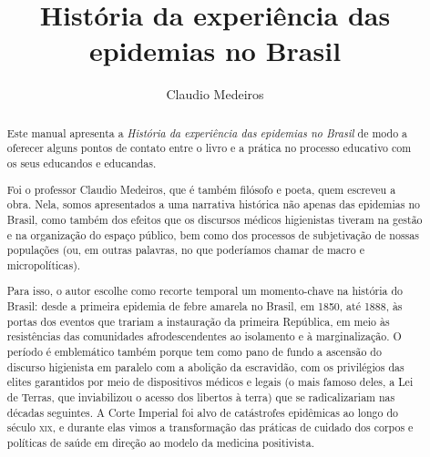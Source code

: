 \documentclass[12pt]{extarticle}
\begin{document}
\newcommand{\AutorLivro}{Claudio Medeiros}
\newcommand{\TituloLivro}{História da experiência das epidemias no Brasil}
\newcommand{\Tema}{Diálogos com a sociologia e com a antropologia}
\newcommand{\Genero}{Narrativa histórica}
\newcommand{\imagemCapa}{./images/PNLD0061-01.png}
\newcommand{\issnppub}{---}
\newcommand{\issnepub}{---}
\newcommand{\colaborador}{{Rafael Zacca Fernandes}}


\title{\TituloLivro}
\author{\AutorLivro}
\def\authornotes{\colaborador}

\date{}
\maketitle

\begin{abstract}

Este manual apresenta a \emph{História da experiência das epidemias no
Brasil} de modo a oferecer alguns pontos de contato entre o livro e a
prática no processo educativo com os seus educandos e educandas.

Foi o professor Claudio Medeiros, que é também filósofo e poeta, quem
escreveu a obra. Nela, somos apresentados a uma narrativa histórica não
apenas das epidemias no Brasil, como também dos efeitos que os discursos
médicos higienistas tiveram na gestão e na organização do espaço
público, bem como dos processos de subjetivação de nossas populações
(ou, em outras palavras, no que poderíamos chamar de macro e
micropolíticas).

Para isso, o autor escolhe como recorte temporal um momento-chave na
história do Brasil: desde a primeira epidemia de febre amarela no
Brasil, em 1850, até 1888, às portas dos eventos que trariam a
instauração da primeira República, em meio às resistências das
comunidades afrodescendentes ao isolamento e à marginalização. O período
é emblemático também porque tem como pano de fundo a ascensão do
discurso higienista em paralelo com a abolição da escravidão, com os
privilégios das elites garantidos por meio de dispositivos médicos e
legais (o mais famoso deles, a Lei de Terras, que inviabilizou o acesso
dos libertos à terra) que se radicalizariam nas décadas seguintes. A
Corte Imperial foi alvo de catástrofes epidêmicas ao longo do século
\textsc{xix}, e durante elas vimos a transformação das práticas de cuidado dos
corpos e políticas de saúde em direção ao modelo da medicina
positivista.


\end{abstract}
\end{document}
